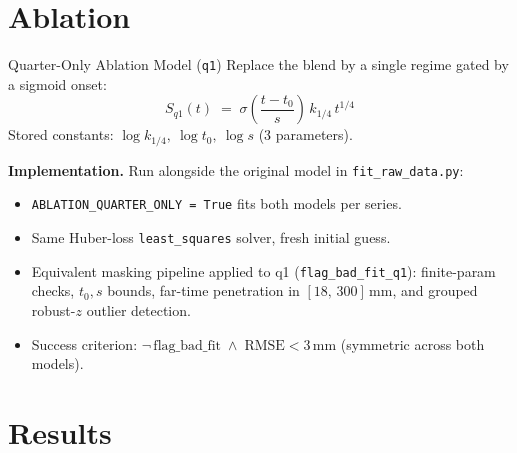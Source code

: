 \documentclass[UTF8,aspectratio=169]{ctexbeamer}
\begin{document}
\section{Ablation}

\begin{frame}{Quarter-Only Ablation Model (\texttt{q1})}
Replace the blend by a single regime gated by a sigmoid onset:
\[
S_{q1}(t) \;=\; \sigma\!\left(\frac{t-t_0}{s}\right)\,k_{1/4}\,t^{1/4}
\]
Stored constants:
$\log k_{1/4},\ \log t_0,\ \log s$ \quad (3 parameters).

\vspace{0.5em}
\textbf{Implementation.} Run alongside the original model in
\texttt{fit\_raw\_data.py}:
\begin{itemize}
  \item \texttt{ABLATION\_QUARTER\_ONLY = True} fits both models per series.
  \item Same Huber-loss \texttt{least\_squares} solver, fresh initial guess.
  \item Equivalent masking pipeline applied to q1 (\texttt{flag\_bad\_fit\_q1}):
        finite-param checks, $t_0,s$ bounds, far-time penetration in
        $[18,\,300]\,$mm, and grouped robust-$z$ outlier detection.
  \item Success criterion: $\lnot\,\text{flag\_bad\_fit} \;\wedge\;
        \text{RMSE} < 3\,$mm \quad (symmetric across both models).
\end{itemize}
\end{frame}

\section{Results}
\end{document}

